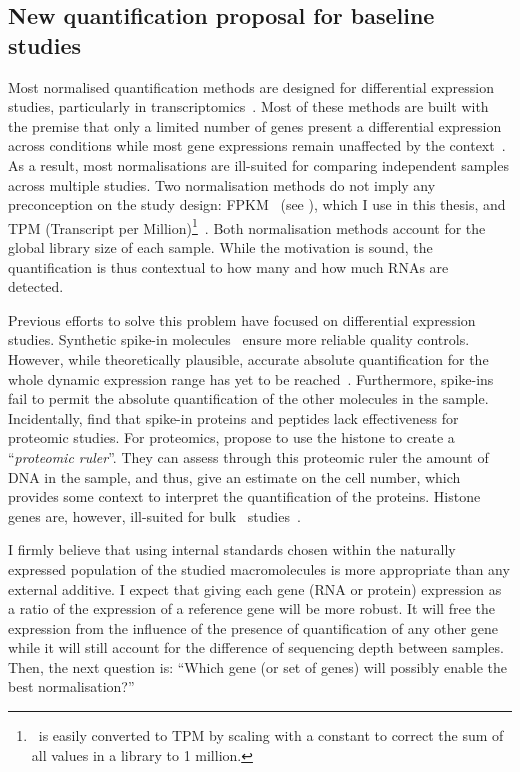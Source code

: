 \subsection*{New quantification proposal for baseline studies}
\vspace{-6mm}
Most normalised quantification methods are designed
for differential expression studies,
particularly in transcriptomics~.
Most of these methods are built with the premise
that only a limited number of genes present a differential expression across conditions
while most gene expressions remain unaffected by the context~.
As a result, most normalisations are ill-suited
for comparing independent samples across multiple studies.
Two normalisation methods do not imply any preconception on the study design:
\gls{FPKM}~ (see ),
which I use in this thesis,
and TPM (Transcript per Million)\footnote{%
\FPKM\ is easily converted to TPM by scaling with a constant
to correct the sum of all values in a library to 1 million.
}~.
Both normalisation methods account for the global library size of each sample.
While the motivation is sound,
the quantification is thus contextual
to %
how many
and how much \glspl{RNA} are detected.\mybr\

Previous efforts to solve this problem have focused
on differential expression studies.
Synthetic spike-in molecules~
ensure more reliable quality controls.
However, while theoretically plausible,
accurate absolute quantification for the whole dynamic expression range
has yet to be reached~.
Furthermore, spike-ins fail to permit the absolute quantification
of the other molecules in the sample.
Incidentally, \citet{Rudnick2014-ar} find that spike-in proteins and peptides
lack effectiveness for proteomic studies.
For proteomics, \citet{Wisniewski2014-kh} propose
to use the histone to create a \enquote{\emph{proteomic ruler}}.
They can assess through this proteomic ruler the amount of \gls{DNA}
in the sample, and thus, give an estimate on the cell number,
which provides some context to interpret the quantification of the proteins.
Histone genes are, however, ill-suited
for bulk \Rnaseq\ studies~.\mybr\

I firmly believe that using internal standards chosen
within the naturally expressed population of the studied macromolecules
is more appropriate than any external additive.
I expect that giving each gene (RNA or protein) expression
as a ratio of the expression of a reference gene will be more robust.
It will free the expression
from the influence of the presence of quantification of any other gene
while it will still account for the difference of sequencing depth between samples.
Then, the next question is:
\enquote{Which gene (or set of genes) will possibly enable the best normalisation?}\mybr\

